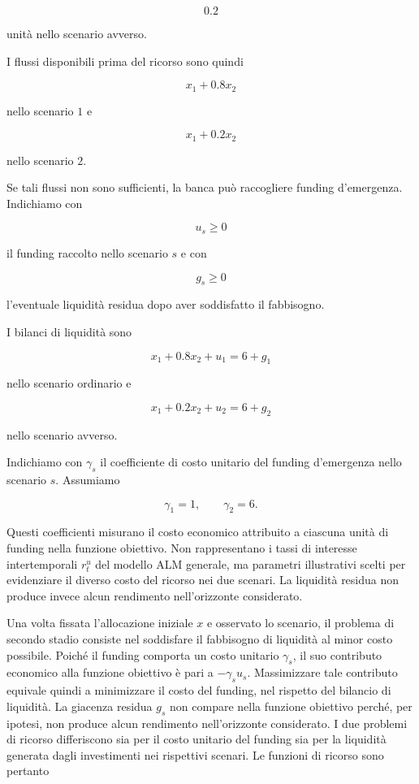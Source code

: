 \begin{example}
\[
0.2
\]

\noindent unit\`a nello scenario avverso.

I flussi disponibili prima del ricorso sono quindi

\[
x_1+0.8x_2
\]

\noindent nello scenario $1$ e

\[
x_1+0.2x_2
\]

\noindent nello scenario $2$.

Se tali flussi non sono sufficienti, la banca pu\`o raccogliere funding
d'emergenza. Indichiamo con

\[
u_s\geq0
\]

\noindent il funding raccolto nello scenario $s$ e con

\[
g_s\geq0
\]

\noindent l'eventuale liquidit\`a residua dopo aver soddisfatto il fabbisogno.

I bilanci di liquidit\`a sono

\[
x_1+0.8x_2+u_1
=
6+g_1
\]

\noindent nello scenario ordinario e

\[
x_1+0.2x_2+u_2
=
6+g_2
\]

\noindent nello scenario avverso.



Indichiamo con $\gamma_s$ il coefficiente di costo
unitario del funding d'emergenza nello scenario $s$.
Assumiamo

\[
\gamma_1=1,
\qquad
\gamma_2=6.
\]

Questi coefficienti misurano il costo economico
attribuito a ciascuna unit\`{a} di funding nella
funzione obiettivo. Non rappresentano i tassi di
interesse intertemporali $r_t^u$ del modello ALM
generale, ma parametri illustrativi scelti per
evidenziare il diverso costo del ricorso nei due
scenari.
%
%
%
%
La liquidit\`a residua non produce invece alcun
rendimento nell'orizzonte considerato.



Una volta fissata l'allocazione iniziale $x$ e osservato
lo scenario, il problema di secondo stadio consiste nel
soddisfare il fabbisogno di liquidit\`{a} al minor costo
possibile. Poich\'{e} il funding comporta un costo
unitario $\gamma_s$, il suo contributo economico
alla funzione obiettivo \`{e} pari a $-\gamma_su_s$.
Massimizzare tale contributo equivale quindi a
minimizzare il costo del funding, nel rispetto del
bilancio di liquidit\`{a}. La giacenza residua $g_s$ non compare nella funzione
obiettivo perch\'{e}, per ipotesi, non produce alcun
rendimento nell'orizzonte considerato. I due problemi
di ricorso differiscono sia per il costo unitario
del funding sia per la liquidit\`{a} generata dagli
investimenti nei rispettivi scenari. Le funzioni di ricorso sono pertanto


\end{example}

